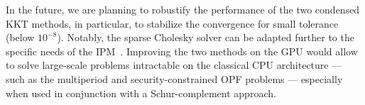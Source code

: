\documentclass{article}
\theoremstyle{definition}
\theoremstyle{remark}
\begin{document}
In the future, we are planning to robustify the performance of
the two condensed KKT methods, in particular, to stabilize the convergence
for small tolerance (below $10^{-8}$). Notably, the sparse Cholesky solver
can be adapted further to the specific needs of the IPM~\cite{wright1999modified}.
Improving the two methods on the GPU would allow to solve large-scale
problems intractable on the classical CPU architecture --- such as the multiperiod
and security-constrained OPF problems --- especially when used in conjunction
with a Schur-complement approach.




\end{document}
